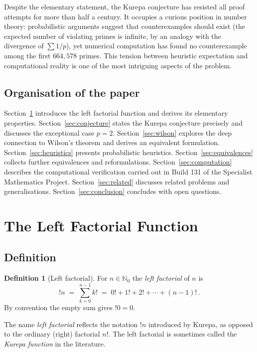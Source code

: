 \documentclass[12pt,a4paper]{amsart}
\theoremstyle{definition}
\newtheorem{definition}[theorem]{Definition}
\newcommand{\N}{\mathbb{N}}
\begin{document}
Despite the elementary statement, the Kurepa conjecture has resisted all proof
attempts for more than half a century.
It occupies a curious position in number theory: probabilistic arguments suggest
that counterexamples should exist (the expected number of violating primes is
infinite, by an analogy with the divergence of $\sum 1/p$), yet numerical
computation has found no counterexample among the first $664{,}578$ primes.
This tension between heuristic expectation and computational reality is one of
the most intriguing aspects of the problem.

\subsection*{Organisation of the paper}

Section~\ref{sec:left-factorial} introduces the left factorial function and
derives its elementary properties.
Section~\ref{sec:conjecture} states the Kurepa conjecture precisely and
discusses the exceptional case $p = 2$.
Section~\ref{sec:wilson} explores the deep connection to Wilson's theorem and
derives an equivalent formulation.
Section~\ref{sec:heuristics} presents probabilistic heuristics.
Section~\ref{sec:equivalences} collects further equivalences and reformulations.
Section~\ref{sec:computation} describes the computational verification carried
out in Build 131 of the Specialist Mathematics Project.
Section~\ref{sec:related} discusses related problems and generalisations.
Section~\ref{sec:conclusion} concludes with open questions.

\section{The Left Factorial Function}
\label{sec:left-factorial}

\subsection{Definition}

\begin{definition}[Left factorial]
For $n \in \N_0$ the \emph{left factorial} of $n$ is
\[
  !n \;=\; \sum_{k=0}^{n-1} k! \;=\; 0! + 1! + 2! + \cdots + (n-1)!\,.
\]
By convention the empty sum gives $!0 = 0$.
\end{definition}

The name \emph{left factorial} reflects the notation $!n$ introduced by
Kurepa, as opposed to the ordinary (right) factorial $n!$.
The left factorial is sometimes called the \emph{Kurepa function} in the
literature.
\end{document}
